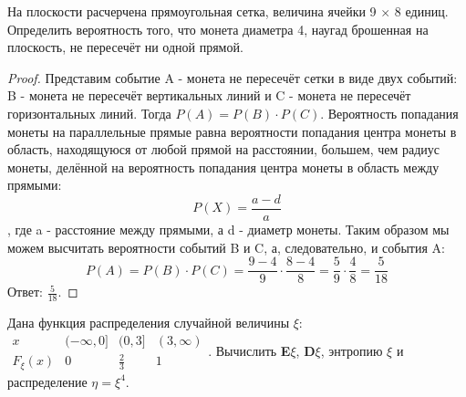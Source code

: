 
\renewcommand*{\proofname}{Решение}

\begin{problem}
	На плоскости расчерчена прямоугольная сетка, величина ячейки 9 $\times$ 8 единиц. Определить вероятность того, что монета диаметра 4, наугад брошенная на плоскость, не пересечёт ни одной прямой.
\end{problem}

\begin{proof}
	Представим событие A - монета не пересечёт сетки в виде двух событий: B - монета не пересечёт вертикальных линий и C - монета не пересечёт горизонтальных линий. Тогда $P(A) = P(B) \cdot P(C)$.
	\newline
	Вероятность попадания монеты на параллельные прямые равна вероятности попадания центра монеты в область, находящуюся от любой прямой на расстоянии, большем, чем радиус монеты, делённой на вероятность попадания центра монеты в область между прямыми:
	\[
		P(X) = \frac{a - d}{a}
	\]
	, где a - расстояние между прямыми, а d - диаметр монеты.
	\newline
	Таким образом мы можем высчитать вероятности событий B и C, а, следовательно, и события A:
	\[
		P(A) = P(B) \cdot P(C) = \frac{9 - 4}{9} \cdot \frac{8 - 4}{8} = \frac{5}{9} \cdot \frac{4}{8} = \frac{5}{18}
	\]
	Ответ: $\frac{5}{18}$.
\end{proof}

\begin{problem}
	Дана функция распределения случайной величины $\xi$:
	$\begin{matrix}
		x & (-\infty,0] & (0,3] & (3,\infty)\\
		F_\xi(x) & 0 & \frac{2}{3} & 1
	\end{matrix}$. Вычислить \textbf{E}$\xi$, \textbf{D}$\xi$, энтропию $\xi$ и распределение $\eta = \xi^4$.
\end{problem}

